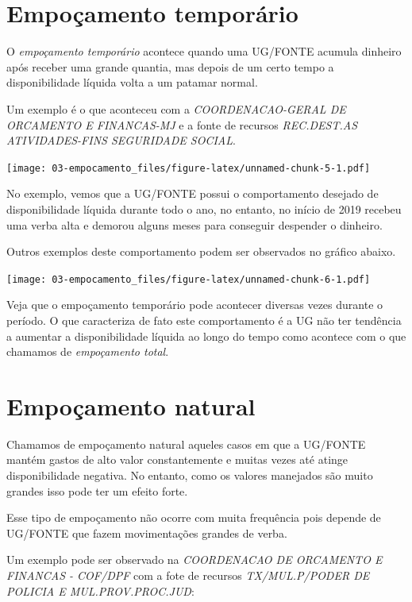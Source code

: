 \documentclass[
]{book}
\begin{document}
\hypertarget{empouxe7amento-temporuxe1rio}{%
\section{Empoçamento temporário}\label{empouxe7amento-temporuxe1rio}}

O \emph{empoçamento temporário} acontece quando uma UG/FONTE acumula dinheiro após receber uma grande quantia, mas depois de um certo tempo a disponibilidade líquida volta a um patamar normal.

Um exemplo é o que aconteceu com a \emph{COORDENACAO-GERAL DE ORCAMENTO E FINANCAS-MJ} e a fonte de recursos \emph{REC.DEST.AS ATIVIDADES-FINS SEGURIDADE SOCIAL}.

\texttt{[image: 03-empocamento\_files/figure-latex/unnamed-chunk-5-1.pdf]}

No exemplo, vemos que a UG/FONTE possui o comportamento desejado de disponibilidade líquida durante todo o ano, no entanto, no início de 2019 recebeu uma verba alta e demorou alguns meses para conseguir despender o dinheiro.

Outros exemplos deste comportamento podem ser observados no gráfico abaixo.

\texttt{[image: 03-empocamento\_files/figure-latex/unnamed-chunk-6-1.pdf]}

Veja que o empoçamento temporário pode acontecer diversas vezes durante o período. O que caracteriza de fato este comportamento é a UG não ter tendência a aumentar a disponibilidade líquida ao longo do tempo como acontece com o que chamamos de \emph{empoçamento total}.

\hypertarget{empouxe7amento-natural}{%
\section{Empoçamento natural}\label{empouxe7amento-natural}}

Chamamos de empoçamento natural aqueles casos em que a UG/FONTE mantém gastos de alto valor constantemente e muitas vezes até atinge disponibilidade negativa. No entanto, como os valores manejados são muito grandes isso pode ter um efeito forte.

Esse tipo de empoçamento não ocorre com muita frequência pois depende de UG/FONTE que fazem movimentações grandes de verba.

Um exemplo pode ser observado na \emph{COORDENACAO DE ORCAMENTO E FINANCAS - COF/DPF} com a fote de recursos \emph{TX/MUL.P/PODER DE POLICIA E MUL.PROV.PROC.JUD}:
\end{document}
